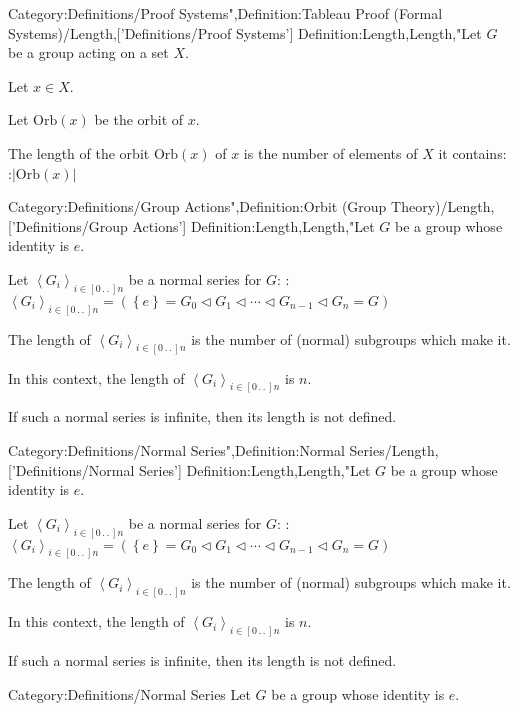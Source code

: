 Category:Definitions/Proof Systems",Definition:Tableau Proof (Formal Systems)/Length,['Definitions/Proof Systems']
Definition:Length,Length,"Let $G$ be a group acting on a set $X$.

Let $x \in X$.


Let $\mathrm {Orb} \left( x \right)$ be the orbit of $x$.

The length of the orbit $\mathrm {Orb} \left( x \right)$ of $x$ is the number of elements of $X$ it contains:
:$\left\lvert \mathrm {Orb} \left( x \right) \right\rvert$


Category:Definitions/Group Actions",Definition:Orbit (Group Theory)/Length,['Definitions/Group Actions']
Definition:Length,Length,"Let $G$ be a group whose identity is $e$.

Let $\left\langle G_i \right\rangle_{i \mathop \in \left[ 0 \,.\,.\,   \right]n}$ be a normal series for $G$:
:$\left\langle G_i \right\rangle_{i \mathop \in \left[ 0 \,.\,.\,   \right]n} = \left( \left\lbrace e \right\rbrace = G_0 \lhd G_1 \lhd \cdots \lhd G_{n-1} \lhd G_n = G \right)$


The length of $\left\langle G_i \right\rangle_{i \mathop \in \left[ 0 \,.\,.\,   \right]n}$ is the number of (normal) subgroups which make it.

In this context, the length of $\left\langle G_i \right\rangle_{i \mathop \in \left[ 0 \,.\,.\,   \right]n}$ is $n$.


If such a normal series is infinite, then its length is not defined.


Category:Definitions/Normal Series",Definition:Normal Series/Length,['Definitions/Normal Series']
Definition:Length,Length,"Let $G$ be a group whose identity is $e$.

Let $\left\langle G_i \right\rangle_{i \mathop \in \left[ 0 \,.\,.\,   \right]n}$ be a normal series for $G$:
:$\left\langle G_i \right\rangle_{i \mathop \in \left[ 0 \,.\,.\,   \right]n} = \left( \left\lbrace e \right\rbrace = G_0 \lhd G_1 \lhd \cdots \lhd G_{n-1} \lhd G_n = G \right)$


The length of $\left\langle G_i \right\rangle_{i \mathop \in \left[ 0 \,.\,.\,   \right]n}$ is the number of (normal) subgroups which make it.

In this context, the length of $\left\langle G_i \right\rangle_{i \mathop \in \left[ 0 \,.\,.\,   \right]n}$ is $n$.


If such a normal series is infinite, then its length is not defined.


Category:Definitions/Normal Series
Let $G$ be a group whose identity is $e$.

